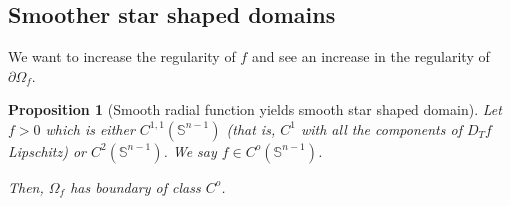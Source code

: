 \documentclass[english,a4paper,10pt,oneside]{scrbook}	%
\theoremstyle{break}
\newtheorem{prop}[equation]{Proposition}
\theoremstyle{remark}
\newcommand{\mS}{\mathbb{S}^{n-1}}
\begin{document}
\subsection{Smoother star shaped domains}

We want to increase the regularity of $f$ and see an increase in the regularity of $\partial \Omega_f$.

\begin{prop}[Smooth radial function yields smooth star shaped domain]
\label{prop:Co_domain}
Let $f>0$ which is either $C^{1,1}(\mS)$ (that is, $C^1$ with all the components of $D_T f$ Lipschitz) or $C^2(\mS)$. We say $f \in C^o(\mS)$. 

Then, $\Omega_f$ has boundary of class $C^o$.

\end{prop}
\end{document}
